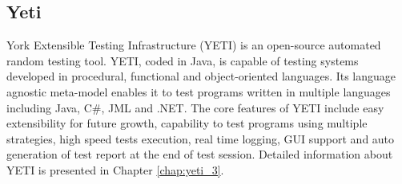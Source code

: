 
\subsection{Yeti}
York Extensible Testing Infrastructure (YETI) is an open-source automated random testing tool. YETI, coded in Java, is capable of testing systems developed in procedural, functional and object-oriented languages. Its language agnostic meta-model enables it to test programs written in multiple languages including Java, C\#, JML and .NET. The core features of YETI include easy extensibility for future growth, capability to test programs using multiple strategies, high speed tests execution, real time logging, GUI support and auto generation of test report at the end of test session. Detailed information about YETI is presented in Chapter \ref{chap:yeti_3}.









